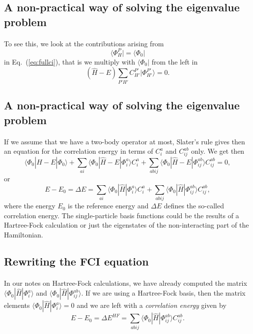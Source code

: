 \subsection*{A non-practical way of solving the eigenvalue problem}

\paragraph{}
To see this, we look at the contributions arising from 
\[
\langle \Phi_H^P | = \langle \Phi_0|
\]
in  Eq.~(\ref{eq:fullci}), that is we multiply with $\langle \Phi_0 |$
from the left in 
\[
(\hat{H} -E)\sum_{P'H'}C_{H'}^{P'}|\Phi_{H'}^{P'} \rangle=0. 
\]



\subsection*{A non-practical way of solving the eigenvalue problem}

\paragraph{}
If we assume that we have a two-body operator at most, Slater's rule gives then an equation for the 
correlation energy in terms of $C_i^a$ and $C_{ij}^{ab}$ only.  We get then
\[
\langle \Phi_0 | \hat{H} -E| \Phi_0\rangle + \sum_{ai}\langle \Phi_0 | \hat{H} -E|\Phi_{i}^{a} \rangle C_{i}^{a}+
\sum_{abij}\langle \Phi_0 | \hat{H} -E|\Phi_{ij}^{ab} \rangle C_{ij}^{ab}=0,
\]
or 
\[
E-E_0 =\Delta E=\sum_{ai}\langle \Phi_0 | \hat{H}|\Phi_{i}^{a} \rangle C_{i}^{a}+
\sum_{abij}\langle \Phi_0 | \hat{H}|\Phi_{ij}^{ab} \rangle C_{ij}^{ab},
\]
where the energy $E_0$ is the reference energy and $\Delta E$ defines the so-called correlation energy.
The single-particle basis functions  could be the results of a Hartree-Fock calculation or just the eigenstates of the non-interacting part of the Hamiltonian.



\subsection*{Rewriting the FCI equation}

\paragraph{}
In our notes on Hartree-Fock calculations, 
we have already computed the matrix $\langle \Phi_0 | \hat{H}|\Phi_{i}^{a}\rangle $ and $\langle \Phi_0 | \hat{H}|\Phi_{ij}^{ab}\rangle$.  If we are using a Hartree-Fock basis, then the matrix elements
$\langle \Phi_0 | \hat{H}|\Phi_{i}^{a}\rangle=0$ and we are left with a \emph{correlation energy} given by
\[
E-E_0 =\Delta E^{HF}=\sum_{abij}\langle \Phi_0 | \hat{H}|\Phi_{ij}^{ab} \rangle C_{ij}^{ab}. 
\]




